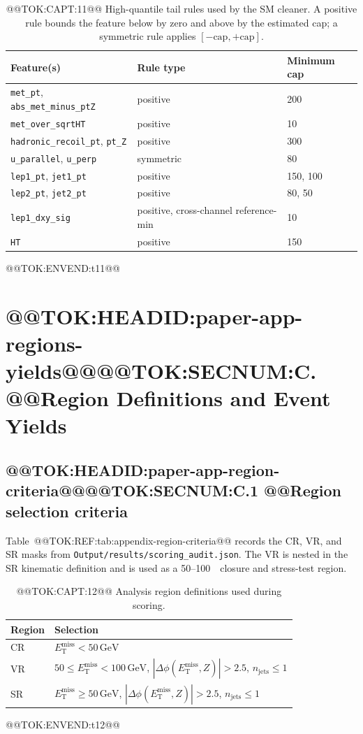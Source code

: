 \documentclass[11pt]{article}
\newcommand{\GeV}{\text{GeV}}
\newcommand{\MET}{\ensuremath{E_{\mathrm{T}}^{\mathrm{miss}}}}
\begin{document}
\begin{table}[H]
\centering
\caption{@@TOK:CAPT:11@@ High-quantile tail rules used by the SM cleaner. A positive rule bounds the feature below by zero and above by the estimated cap; a symmetric rule applies \([-\mathrm{cap},+\mathrm{cap}]\).}
\label{tab:appendix-cleaning-tail}
%
\begin{tabular}{lll}
\toprule
Feature(s) & Rule type & Minimum cap \\
\midrule
\texttt{met\_pt}, \texttt{abs\_met\_minus\_ptZ} & positive & 200 \\
\texttt{met\_over\_sqrtHT} & positive & 10 \\
\texttt{hadronic\_recoil\_pt}, \texttt{pt\_Z} & positive & 300 \\
\texttt{u\_parallel}, \texttt{u\_perp} & symmetric & 80 \\
\texttt{lep1\_pt}, \texttt{jet1\_pt} & positive & 150, 100 \\
\texttt{lep2\_pt}, \texttt{jet2\_pt} & positive & 80, 50 \\
\texttt{lep1\_dxy\_sig} & positive, cross-channel reference-min & 10 \\
\texttt{HT} & positive & 150 \\
\bottomrule
\end{tabular}

@@TOK:ENVEND:t11@@\end{table}


\section{@@TOK:HEADID:paper-app-regions-yields@@@@TOK:SECNUM:C. @@Region Definitions and Event Yields}

\subsection{@@TOK:HEADID:paper-app-region-criteria@@@@TOK:SECNUM:C.1 @@Region selection criteria}

Table~@@TOK:REF:tab:appendix-region-criteria@@ records the CR, VR, and SR masks from
\texttt{Output/results/scoring\_audit.json}. The VR is nested in the SR kinematic
definition and is used as a 50--100~\GeV\ closure and stress-test region.

\begin{table}[h]
\centering
\caption{@@TOK:CAPT:12@@ Analysis region definitions used during scoring.}
\label{tab:appendix-region-criteria}

\begin{tabular}{ll}
\toprule
Region & Selection \\
\midrule
CR & \(\MET < 50\,\GeV\) \\
VR & \(50 \le \MET < 100\,\GeV\), \(|\Delta\phi(\MET,Z)|>2.5\), \(n_{\mathrm{jets}}\le 1\) \\
SR & \(\MET \ge 50\,\GeV\), \(|\Delta\phi(\MET,Z)|>2.5\), \(n_{\mathrm{jets}}\le 1\) \\
\bottomrule
\end{tabular}

@@TOK:ENVEND:t12@@\end{table}
\end{document}

